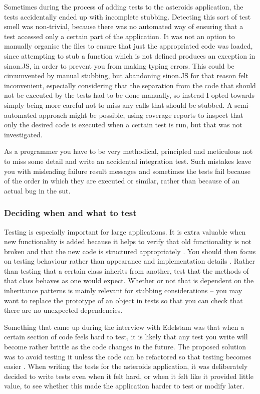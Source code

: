 \documentclass[11pt]{article}
\begin{document}
Sometimes during the process of adding tests to the asteroids application, the tests accidentally ended up with incomplete stubbing. Detecting this sort of test smell was non-trivial, because there was no automated way of ensuring that a test accessed only a certain part of the application. It was not an option to manually organise the files to ensure that just the appropriated code was loaded, since attempting to stub a function which is not defined produces an exception in sinon.JS, in order to prevent you from making typing errors. This could be circumvented by manual stubbing, but abandoning sinon.JS for that reason felt inconvenient, especially considering that the separation from the code that should not be executed by the tests had to be done manually, so instead I opted towards simply being more careful not to miss any calls that should be stubbed. A semi-automated approach might be possible, using coverage reports to inspect that only the desired code is executed when a certain test is run, but that was not investigated.

As a programmer you have to be very methodical, principled and meticulous not to miss some detail and write an accidental integration test. Such mistakes leave you with misleading failure result messages and sometimes the tests fail because of the order in which they are executed or similar, rather than because of an actual bug in the \gls{sut}.

\subsubsection{Deciding when and what to test}

Testing is especially important for large applications. It is extra valuable when new functionality is added because it helps to verify that old functionality is not broken and that the new code is structured appropriately \cite[questions~6-7]{Stenmark}. You should then focus on testing behaviour rather than appearance and implementation details \cite[question~10]{Edelstam}. Rather than testing that a certain class inherits from another, test that the methods of that class behaves as one would expect. Whether or not that is dependent on the inheritance patterns is mainly relevant for stubbing considerations -- you may want to replace the prototype of an object in tests so that you can check that there are no unexpected dependencies.

Something that came up during the interview with Edelstam was that when a certain section of code feels hard to test, it is likely that any test you write will become rather brittle as the code changes in the future. The proposed solution was to avoid testing it unless the code can be refactored so that testing becomes easier \cite[question~30]{Edelstam}. When writing the tests for the asteroids application, it was deliberately decided to write tests even when it felt hard, or when it felt like it provided little value, to see whether this made the application harder to test or modify later.
\end{document}
